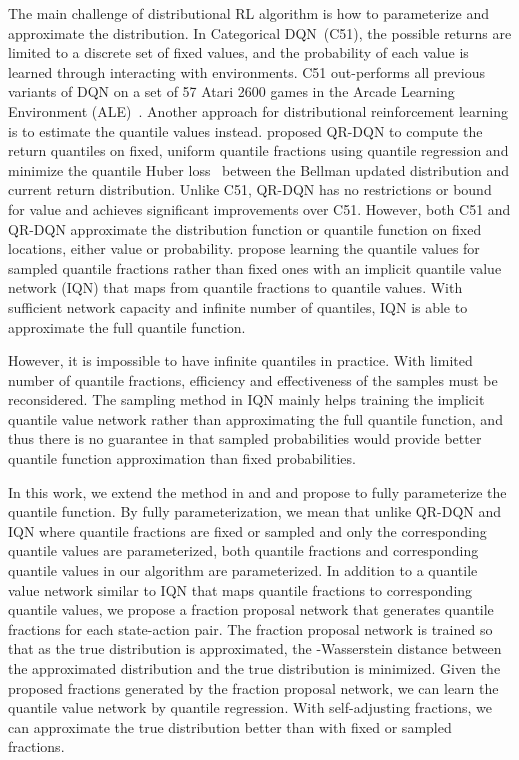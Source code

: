 \documentclass{article}
\begin{document}
The main challenge of distributional RL algorithm is how to parameterize and approximate the distribution. In Categorical DQN~\citep{bellemare2017distributional}(C51), the possible returns are limited to a discrete set of fixed values, and the probability of each value is learned through interacting with environments. C51 out-performs all previous variants of DQN on a set of 57 Atari 2600 games in the Arcade Learning Environment (ALE)~\citep{bellemare2013arcade}.
Another approach for distributional reinforcement learning is to estimate the quantile values instead. 
\cite{dabney2018distributional} proposed QR-DQN to compute the return quantiles on fixed, uniform quantile fractions using quantile regression and minimize the quantile Huber loss~\citep{huber:1964} between the Bellman updated distribution and current return distribution. Unlike C51, QR-DQN has no restrictions or bound for value and achieves significant improvements over C51. However, both C51 and QR-DQN approximate the distribution function or quantile function on fixed locations, either value or probability. \cite{dabney2018implicit} propose learning the quantile values for sampled quantile fractions rather than fixed ones with an implicit quantile value network (IQN) that maps from quantile fractions to quantile values. With sufficient network capacity and infinite number of quantiles, IQN is able to approximate the full quantile function.

However, it is impossible to have infinite quantiles in practice. With limited number of quantile fractions, efficiency and effectiveness of the samples must be reconsidered. The sampling method in IQN mainly helps training the implicit quantile value network rather than approximating the full quantile function, and thus there is no guarantee in that sampled probabilities would provide better quantile function approximation than fixed probabilities. 

In this work, we extend the method in \cite{dabney2018distributional} and \cite{dabney2018implicit} and propose to fully parameterize the quantile function. By fully parameterization, we mean that unlike QR-DQN and IQN where quantile fractions are fixed or sampled and only the corresponding quantile values are parameterized, both quantile fractions and corresponding quantile values in our algorithm are parameterized. In addition to a quantile value network similar to IQN that maps quantile fractions to corresponding quantile values, we propose a fraction proposal network that generates quantile fractions for each state-action pair. The fraction proposal network is trained so that as the true distribution is approximated, the -Wasserstein distance between the approximated distribution and the true distribution is minimized. Given the proposed fractions generated by the fraction proposal network, we can learn the quantile value network by quantile regression. With self-adjusting fractions, we can approximate the true distribution better than with fixed or sampled fractions.
\end{document}
